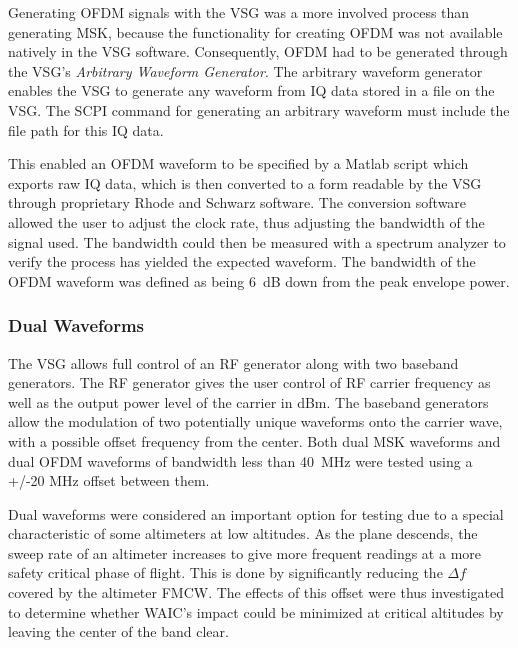 Generating OFDM signals with the VSG was a more involved process than generating MSK, because the functionality for creating OFDM was not available natively in the VSG software. Consequently, OFDM had to be generated through the VSG's \textit{Arbitrary Waveform Generator}. The arbitrary waveform generator enables the VSG to generate any waveform from IQ data stored in a file on the VSG. The SCPI command for generating an arbitrary waveform must include the file path for this IQ data.  

This enabled an OFDM waveform to be specified by a Matlab script which exports raw IQ data, which is then converted to a form readable by the VSG through proprietary Rhode and Schwarz software. The conversion software allowed the user to adjust the clock rate, thus adjusting the bandwidth of the signal used. The bandwidth could then be measured with a spectrum analyzer to verify the process has yielded the expected waveform. The bandwidth of the OFDM waveform was defined as being 6~dB down from the peak envelope power. 


\subsubsection{Dual Waveforms}\label{subsub:Dual}
The VSG allows full control of an RF generator along with two baseband generators. The RF generator gives the user control of RF carrier frequency as well as the output power level of the carrier in dBm. The baseband generators allow the modulation of two potentially unique waveforms onto the carrier wave, with a possible offset frequency from the center. Both dual MSK waveforms and dual OFDM waveforms of bandwidth less than 40~MHz were tested using a +/-20 MHz offset between them. 

Dual waveforms were considered an important option for testing due to a special characteristic of some altimeters at low altitudes. As the plane descends, the sweep rate of an altimeter increases to give more frequent readings at a more safety critical phase of flight. This is done by significantly reducing the $\Delta f$ covered by the altimeter FMCW. The effects of this offset were thus investigated to determine whether WAIC's impact could be minimized at critical altitudes by leaving the center of the band clear. 


